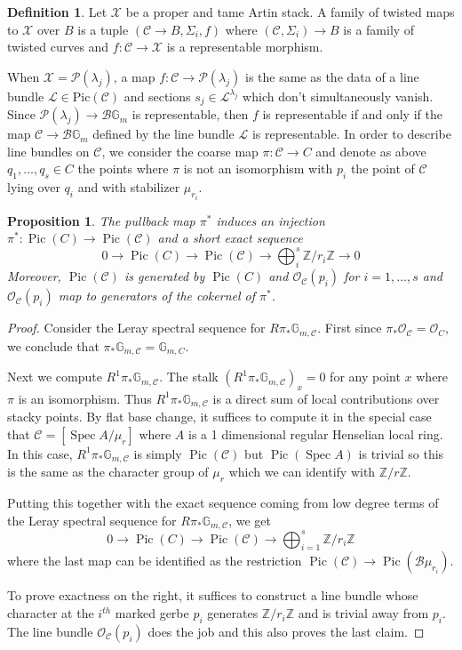 \documentclass[a4paper,12pt]{amsart}
\newtheorem{prop}[thm]{Proposition}
\theoremstyle{definition}
\newtheorem{defn}[thm]{Definition}
\newcommand{\bG}{\mathbb{G}}
\newcommand{\cX}{\mathcal{X}}
\newcommand{\cO}{\mathcal{O}}
\newcommand{\cC}{\mathcal{C}}
\newcommand{\cL}{\mathcal{L}}
\newcommand{\Cc}{\mathcal{C}}
\newcommand{\Pc}{\mathcal{P}}
\newcommand{\Z}{\mathbb{Z}}
\DeclareMathOperator{\Spec}{Spec}
\DeclareMathOperator{\Pic}{Pic}
\begin{document}
	\begin{defn}  Let $\cX$ be a proper and tame Artin stack. A family of twisted maps to $\cX$ over $B$ is a tuple $(\Cc \to B, \Sigma_i, f)$ where $(\Cc, \Sigma_i) \to B$ is a family of twisted curves and $f : \Cc \to \cX$ is a representable morphism.
	\end{defn}
	
	When $\cX = \Pc(\lambda_j)$, a map $f : \Cc \to \Pc(\lambda_j)$ is the same as the data of a line bundle $\cL \in \mathrm{Pic}(\Cc)$ and sections $s_j \in \cL^{\lambda_j}$ which don't simultaneously vanish. Since $\Pc(\lambda_j) \to \mathcal{B} \bG_m$ is representable, then $f$ is representable if and only if the map $\Cc \to \mathcal{B} \bG_m$ defined by the line bundle $\cL$ is representable. In order to describe line bundles on $\Cc$, we consider the coarse map $\pi : \Cc \to C$ and denote as above $q_1, \ldots, q_s \in C$ the points where $\pi$ is not an isomorphism with $p_i$ the point of $\Cc$ lying over $q_i$ and with stabilizer $\mu_{r_i}$.
	
	\begin{prop}\label{prop:twisted:pic} The pullback map $\pi^*$ induces an injection $\pi^*:\Pic(C) \to \Pic(\Cc)$ and a short exact sequence
		\begin{equation}\label{eqn:twisted:pic}
			0 \to \Pic(C) \to \Pic(\Cc) \to \bigoplus_{i}^s \mathbb{Z}/r_i\mathbb{Z} \to 0
		\end{equation}
		Moreover, $\Pic(\cC)$ is generated by $\Pic(C)$ and $\cO_{\cC}(p_i)$ for $i = 1, \ldots, s$ and $\cO_{\cC}(p_i)$ map to generators of the cokernel of $\pi^*$. \\
	\end{prop}
	\begin{proof} Consider the Leray spectral sequence for $R\pi_* \bG_{m,\cC}$. First since $\pi_*\cO_{\cC} = \cO_C$, we conclude that $\pi_*\bG_{m, \cC} = \bG_{m,C}$. 
		
		Next we compute $R^1\pi_*\bG_{m,\cC}$. The stalk $(R^1\pi_*\bG_{m,\cC})_x = 0$ for any point $x$ where $\pi$ is an isomorphism. Thus  $R^1\pi_*\bG_{m,\cC}$ is a direct sum of local contributions over stacky points. By flat base change, it suffices to compute it in the special case that $\cC = [\Spec A/\mu_r]$ where $A$ is a 1 dimensional regular Henselian local ring. In this case, $R^1\pi_*\bG_{m, \cC}$ is simply $\Pic(\cC)$ but $\Pic(\Spec A)$ is trivial so this is the same as the character group of $\mu_r$ which we can identify with $\Z/r\Z$.
		
		Putting this together with the exact sequence coming from low degree terms of the Leray spectral sequence for $R\pi_*\bG_{m,\cC}$, we get
		$$
		0 \to \Pic(C) \to \Pic(\cC) \to \bigoplus_{i = 1}^{s} \Z/r_i \Z
		$$
		where the last map can be identified as the restriction $\Pic(\cC) \to \Pic(\mathcal{B} \mu_{r_i})$. 
		
		To prove exactness on the right, it suffices to construct a line bundle whose character at the $i^{th}$ marked gerbe $p_i$ generates $\Z/r_i\Z$ and is trivial away from $p_i$. The line bundle $\cO_{\cC}(p_i)$ does the job and this also proves the last claim. 
	\end{proof} 
	
\end{document}
